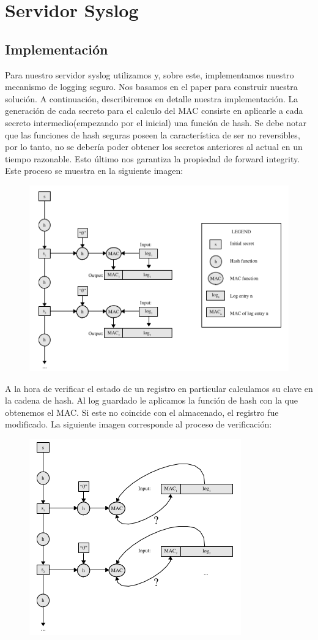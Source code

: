 \section{Servidor Syslog}
\subsection{Implementación}
Para nuestro servidor syslog utilizamos \cite{bio6} y, sobre este, implementamos nuestro 
mecanismo de logging seguro. Nos basamos en el paper \cite{bio2} para construir nuestra solución. A continuación, describiremos en detalle nuestra implementación.
La generación de cada secreto para el calculo del MAC consiste en aplicarle a cada secreto intermedio(empezando por el inicial) una función de hash. Se debe notar que las funciones de hash seguras poseen la característica de ser no reversibles, por lo tanto, no se debería poder obtener los secretos anteriores al actual en un tiempo razonable. Esto último nos garantiza la propiedad de forward integrity. Este proceso se muestra en la siguiente imagen:
\begin{figure}[H]
\centering
\includegraphics[scale=1]{imagenes/MAC.png}
\end{figure}
A la hora de verificar el estado de un registro en particular calculamos su clave en la cadena de hash.
Al log guardado le aplicamos la función de hash con la que obtenemos el MAC. Si este no coincide con el almacenado,
el registro fue modificado. La siguiente imagen corresponde al proceso de verificación:
\begin{figure}[H]
\centering
\includegraphics[scale=1]{imagenes/Verification.png}
\end{figure}
